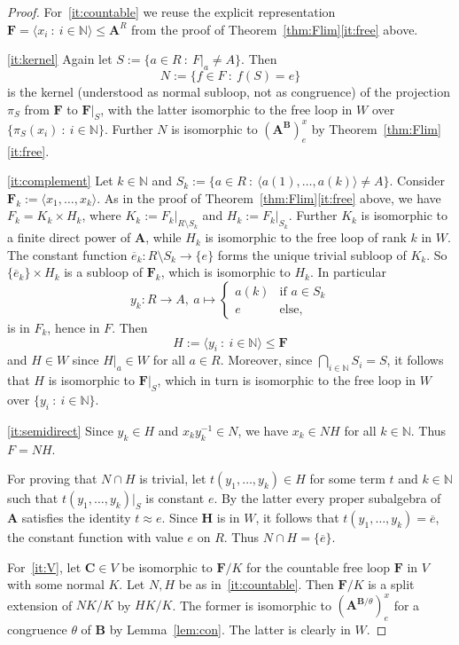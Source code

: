 \documentclass[12pt,a4paper,reqno]{amsart}
\numberwithin{equation}{section}
\theoremstyle{plain}
\theoremstyle{definition}
\newcommand{\A}{\mathbf{A}}
\newcommand{\B}{\mathbf{B}}
\newcommand{\C}{\mathbf{C}}
\newcommand{\F}{\mathbf{F}}
\renewcommand{\H}{\mathbf{H}}
\newcommand{\N}{\mathbb{N}}
\newcommand{\st}{\: :\:}
\begin{document}
\begin{proof}
 For~\eqref{it:countable} we reuse the explicit representation $\F = \langle x_i \st i \in\N\rangle \leq \A^R$
 from the proof of Theorem~\ref{thm:Flim}\eqref{it:free} above.

 \eqref{it:kernel}
 Again let $S := \{ a\in R \st F|_a \neq A \}$. Then
\[ N := \{ f\in F \st f(S) = e \} \]
is the kernel (understood as normal subloop, not as congruence)
of the projection $\pi_S$ from $\F$ to $\F|_S$, with the latter isomorphic to the free loop
in $W$ over
 $\{\pi_S(x_i) \st i\in\N\}$.
 Further $N$ is isomorphic to $(\A^\B)^x_e$ by Theorem~\ref{thm:Flim}\eqref{it:free}.

 \eqref{it:complement}
 Let $k\in\N$ and $S_k :=  \{ a\in R \st \langle a(1),\dots,a(k)\rangle \neq A \}$.
 Consider $\F_k := \langle x_1,\dots, x_k\rangle$.
 As in the proof of Theorem~\ref{thm:Flim}\eqref{it:free} above, we have $F_k = K_k \times H_k$, where 
  $K_k := F_k|_{R\setminus S_k}$ and  $H_k := F_k|_{S_k}$.
  Further $K_k$ is isomorphic to a finite direct power of $\A$, while $H_k$ is isomorphic to the free loop
  of rank $k$ in $W$.
The constant function $\overline{e}_k\colon R\setminus S_k \to \{e\}$ forms the unique trivial subloop
of $K_k$. So $\{\overline{e}_k\} \times H_k$ is a subloop of $\F_k$, which is isomorphic to $H_k$.
 In particular
\[ y_k\colon R\to A,\ a\mapsto \begin{cases} a(k)
  & \text{if } a\in S_k \\ e & \text{else}, \end{cases} \]
 is in $F_k$, hence in $F$.
 Then
 \[ H := \langle y_i \st i\in\N \rangle \leq \F \]
 and $H\in W$ since  $H|_a\in W$ for all $a\in R$.
 Moreover, since $\bigcap_{i\in\N} S_i = S$, it follows that $H$ is isomorphic to $\F|_S$, which in turn is isomorphic to
 the free loop in $W$ over $\{ y_i \st i\in\N \}$.

 \eqref{it:semidirect}
 Since $y_k\in H$ and $x_ky_k^{-1}\in N$, we have $x_k \in NH$ for all $k\in\N$. Thus $F = NH$.

 For proving that $N\cap H$ is trivial, let $t(y_1,\dots,y_k)\in H$ for some term $t$ and $k\in\N$ such that
 $t(y_1,\dots,y_k)|_S$ is constant $e$.
 By the latter every proper subalgebra of $\A$ satisfies the identity $t\approx e$. Since $\H$ is in $W$,
 it follows that $t(y_1,\dots,y_k) = \overline{e}$, the constant function with value $e$ on $R$. Thus $N\cap H = \{\overline{e}\}$.

 For~\eqref{it:V}, let $\C\in V$ be isomorphic to $\F/K$ for the countable free loop $\F$ in $V$ with some normal $K$.
 Let $N,H$ be as in~\eqref{it:countable}. Then $\F/K$ is a split extension of $NK/K$ by $HK/K$.
 The former is isomorphic to $(\A^{\B/\theta})^x_e$ for a congruence $\theta$ of $\B$ by Lemma~\ref{lem:con}.
 The latter is clearly in $W$.
\end{proof}
\end{document}
